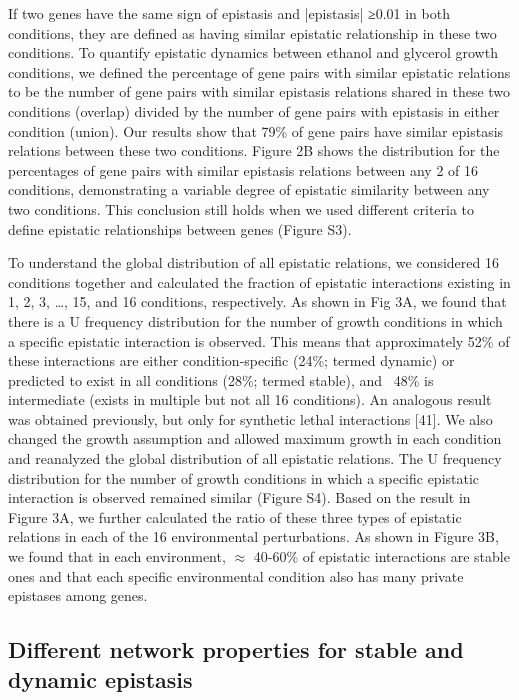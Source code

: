 If two genes have the same sign of epistasis and |epistasis| ≥0.01 in
both conditions, they are defined as having similar epistatic
relationship in these two conditions. To quantify epistatic dynamics
between ethanol and glycerol growth conditions, we defined the
percentage of gene pairs with similar epistatic relations to be the
number of gene pairs with similar epistasis relations shared in these
two conditions (overlap) divided by the number of gene pairs with
epistasis in either condition (union). Our results show that 79\% of
gene pairs have similar epistasis relations between these two
conditions. Figure 2B shows the distribution for the percentages of
gene pairs with similar epistasis relations between any 2 of 16
conditions, demonstrating a variable degree of epistatic similarity
between any two conditions.  This conclusion still holds when we used
different criteria to define epistatic relationships between genes
(Figure S3).

To understand the global distribution of all epistatic relations, we
considered 16 conditions together and calculated the fraction of
epistatic interactions existing in 1, 2, 3, \ldots, 15, and 16
conditions, respectively. As shown in Fig 3A, we found that there is a
U frequency distribution for the number of growth conditions in which
a specific epistatic interaction is observed. This means that
approximately 52\% of these interactions are either condition-specific
(24\%; termed dynamic) or predicted to exist in all conditions (28\%;
termed stable), and ~48\% is intermediate (exists in multiple but not
all 16 conditions). An analogous result was obtained previously, but
only for synthetic lethal interactions [41]. We also changed the
growth assumption and allowed maximum growth in each condition and
reanalyzed the global distribution of all epistatic relations. The U
frequency distribution for the number of growth conditions in which a
specific epistatic interaction is observed remained similar (Figure
S4). Based on the result in Figure 3A, we further calculated the ratio
of these three types of epistatic relations in each of the 16
environmental perturbations. As shown in Figure 3B, we found that in
each environment, $\approx$ 40-60\% of epistatic interactions are stable ones
and that each specific environmental condition also has many private
epistases among genes.

\subsection{Different network properties for stable and dynamic epistasis}

